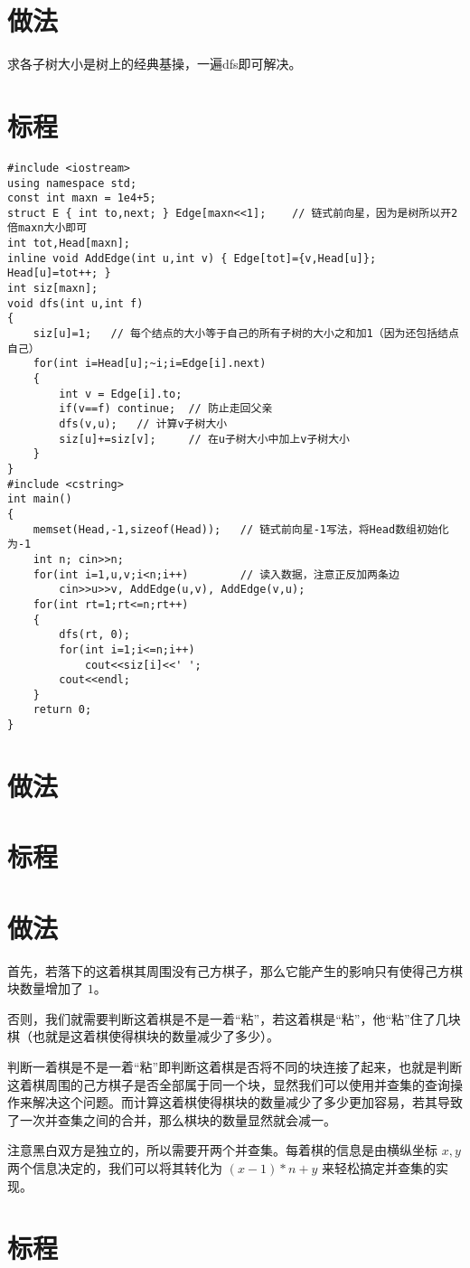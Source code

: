 \documentclass{ctsol}
\begin{document}
\makesolution
\section*{做法}
求各子树大小是树上的经典基操，一遍dfs即可解决。

\section*{标程}
\begin{lstlisting}
#include <iostream>
using namespace std;
const int maxn = 1e4+5;
struct E { int to,next; } Edge[maxn<<1];    // 链式前向星，因为是树所以开2倍maxn大小即可
int tot,Head[maxn];
inline void AddEdge(int u,int v) { Edge[tot]={v,Head[u]}; Head[u]=tot++; }
int siz[maxn];
void dfs(int u,int f)
{
    siz[u]=1;   // 每个结点的大小等于自己的所有子树的大小之和加1（因为还包括结点自己）
    for(int i=Head[u];~i;i=Edge[i].next)
    {
        int v = Edge[i].to;
        if(v==f) continue;  // 防止走回父亲
        dfs(v,u);   // 计算v子树大小
        siz[u]+=siz[v];     // 在u子树大小中加上v子树大小
    }
}
#include <cstring>
int main()
{
    memset(Head,-1,sizeof(Head));   // 链式前向星-1写法，将Head数组初始化为-1
    int n; cin>>n;
    for(int i=1,u,v;i<n;i++)        // 读入数据，注意正反加两条边
        cin>>u>>v, AddEdge(u,v), AddEdge(v,u);
    for(int rt=1;rt<=n;rt++)
    {
        dfs(rt, 0);
        for(int i=1;i<=n;i++)
            cout<<siz[i]<<' ';
        cout<<endl;
    }
    return 0;
}
\end{lstlisting}

\makesolution
\section*{做法}
\section*{标程}

\makesolution
\section*{做法}
首先，若落下的这着棋其周围没有己方棋子，那么它能产生的影响只有使得己方棋块数量增加了 $1$。

否则，我们就需要判断这着棋是不是一着“粘”，若这着棋是“粘”，他“粘”住了几块棋（也就是这着棋使得棋块的数量减少了多少）。

判断一着棋是不是一着“粘”即判断这着棋是否将不同的块连接了起来，也就是判断这着棋周围的己方棋子是否全部属于同一个块，显然我们可以使用并查集的查询操作来解决这个问题。而计算这着棋使得棋块的数量减少了多少更加容易，若其导致了一次并查集之间的合并，那么棋块的数量显然就会减一。

注意黑白双方是独立的，所以需要开两个并查集。每着棋的信息是由横纵坐标 $x,y$ 两个信息决定的，我们可以将其转化为 $(x-1)*n + y$ 来轻松搞定并查集的实现。

\section*{标程}
\end{document}
